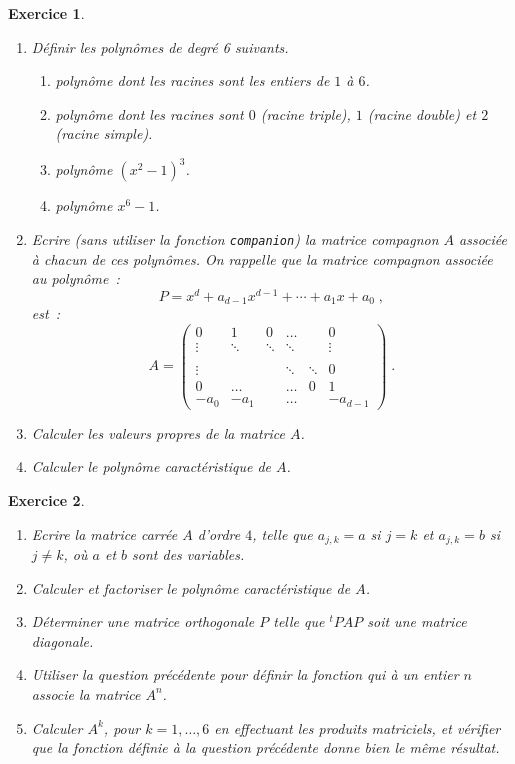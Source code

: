 \documentclass{article}
\newtheorem{exo}{Exercice}[section]
\begin{document}
\begin{exo}{\rm ~
\begin{enumerate}
\item
D\'efinir les polyn\^omes de degr\'e 6 suivants.
\begin{enumerate}
\item
polyn\^ome dont les racines sont les entiers de $1$ \`a $6$.
\item
polyn\^ome dont les racines sont $0$ (racine triple), $1$
(racine double) et $2$ (racine simple).
\item
polyn\^ome $(x^2-1)^3$.
\item
polyn\^ome $x^6-1$.
\end{enumerate}
%

\item
Ecrire (sans utiliser la fonction \verb|companion|)
la matrice compagnon $A$ associ\'ee \`a chacun de ces polyn\^omes.
On rappelle que la matrice compagnon associ\'ee au polyn\^ome~:
$$
P=x^d+a_{d-1}x^{d-1}+\cdots+a_1x+a_0\;,
$$
est~:
\begin{equation*}
\label{compagnon}
A = 
\left(
\begin{array}{cccccc}
0&1&0&\ldots&&0\\
\vdots&\ddots&\ddots&\ddots&&\vdots\\
&&&&&\\
\vdots&&&\ddots&\ddots&0\\
0&\ldots&&\ldots&0&1\\
-a_0&-a_1&&\ldots&&-a_{d-1}
\end{array}
\right)\;.
\end{equation*} 
\item
Calculer les valeurs propres de la matrice $A$.
\item
Calculer le polyn\^ome caract\'eristique de $A$. 
\end{enumerate} 
}\end{exo}
\begin{exo}{\rm ~
\begin{enumerate}
\item
Ecrire la matrice carr\'ee $A$ d'ordre $4$, telle que $a_{j,k}=a$ si $j=k$ et
$a_{j,k}=b$ si $j \neq k$, o\`u $a$ et $b$ sont des variables. 
\item
Calculer et factoriser le polyn\^ome caract\'eristique de $A$.
\item
D\'eterminer une matrice orthogonale $P$ telle que ${^t\!P} A P$ soit
une matrice diagonale.
\item
Utiliser la question pr\'ec\'edente pour d\'efinir la fonction 
qui \`a un entier $n$ associe la matrice $A^n$.
\item
Calculer $A^k$, pour $k=1,\ldots,6$ en effectuant les produits
matriciels, et v\'erifier que la fonction d\'efinie \`a la question
pr\'ec\'edente donne bien le m\^eme r\'esultat. 
\end{enumerate} 
}\end{exo}
\end{document}
